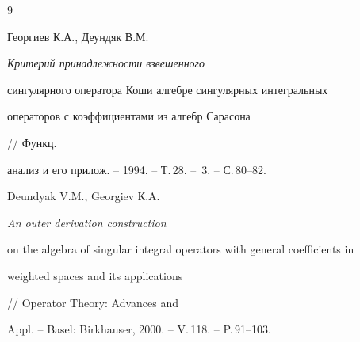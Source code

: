 \begin{thebibliography}{9}


Георгиев К.А., Деундяк В.М. {\em Критерий принадлежности взвешенного 


сингулярного оператора Коши алгебре сингулярных интегральных 


операторов с коэффициентами из алгебр Сарасона} // Функц. 


анализ и его прилож. -- 1994. -- Т.\,28. -- \No\,3. -- С.\,80--82. 




Deundyak V.M., Georgiev К.A. {\em An outer derivation construction 


on the algebra of singular integral operators with general coefficients in 


weighted spaces and its applications} // Operator Theory: Advances and 


Appl. -- Basel: Birkhauser, 2000. -- V.\,118. -- P.\,91--103. 


 


\end{thebibliography} 


 


\vskip 0.5cm 


 






 


\label{end} 


 


